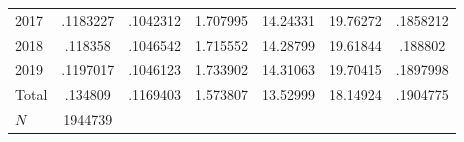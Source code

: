 {\begin{longtable}{l*{1}{cccccc}}
2017        &    .1183227&    .1042312&    1.707995&    14.24331&    19.76272&    .1858212\\
2018        &     .118358&    .1046542&    1.715552&    14.28799&    19.61844&     .188802\\
2019        &    .1197017&    .1046123&    1.733902&    14.31063&    19.70415&    .1897998\\
Total       &     .134809&    .1169403&    1.573807&    13.52999&    18.14924&    .1904775\\
\hline
\(N\)       &     1944739&            &            &            &            &            \\
\hline\hline
\end{longtable}
}
